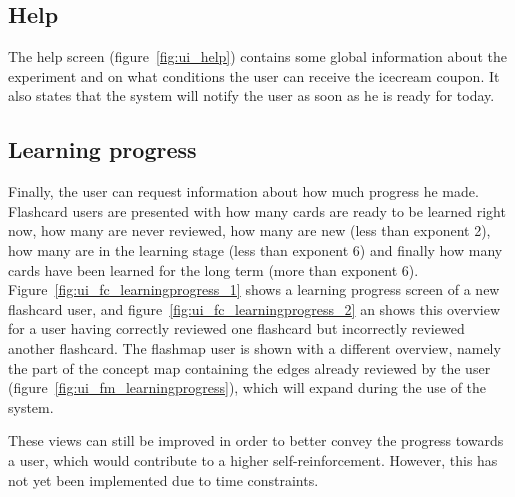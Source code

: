 \subsection{Help}

The help screen (figure~\ref{fig:ui_help}) contains some global information about the experiment and on what conditions the user can receive the icecream coupon. It also states that the system will notify the user as soon as he is ready for today.

\subsection{Learning progress}
\label{sec:learningprogress}

Finally, the user can request information about how much progress he made. Flashcard users are presented with how many cards are ready to be learned right now, how many are never reviewed, how many are new (less than exponent 2), how many are in the learning stage (less than exponent 6) and finally how many cards have been learned for the long term (more than exponent 6). Figure~\ref{fig:ui_fc_learningprogress_1} shows a learning progress screen of a new flashcard user, and figure~\ref{fig:ui_fc_learningprogress_2} an shows this overview for a user having correctly reviewed one flashcard but incorrectly reviewed another flashcard. The flashmap user is shown with a different overview, namely the part of the concept map containing the edges already reviewed by the user (figure~\ref{fig:ui_fm_learningprogress}), which will expand during the use of the system.

These views can still be improved in order to better convey the progress towards a user, which would contribute to a higher self-reinforcement. However, this has not yet been implemented due to time constraints.
